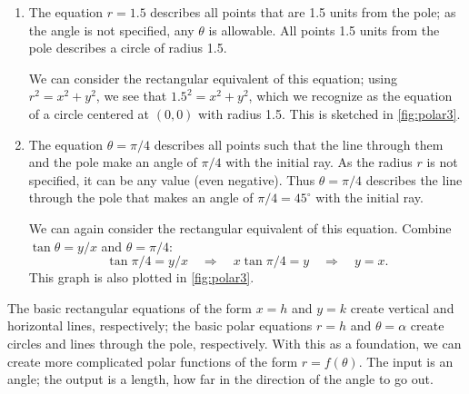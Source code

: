 {\begin{enumerate}
\item		The equation $r=1.5$ describes all points that are 1.5 units from the pole; as the angle is not specified, any $\theta$ is allowable. All points 1.5 units from the pole describes a circle of radius 1.5.

We can consider the rectangular equivalent of this equation; using $r^2=x^2+y^2$, we see that $1.5^2=x^2+y^2$, which we recognize as the equation of a circle centered at $(0,0)$ with radius 1.5. This is sketched in \autoref{fig:polar3}.


\item		The equation $\theta = \pi/4$ describes all points such that the line through them and the pole make an angle of $\pi/4$ with the initial ray. As the radius $r$ is not specified, it can be any value (even negative). Thus $\theta = \pi/4$ describes the line through the pole that makes an angle of $\pi/4 = 45^\circ$ with the initial ray.

We can again consider the rectangular equivalent of this equation. Combine $\tan \theta =y/x$ and $\theta =\pi/4$:
\[\tan \pi/4 = y/x \quad \Rightarrow \quad x\tan \pi/4 = y \quad \Rightarrow \quad y = x.\] 
This graph is also plotted in \autoref{fig:polar3}.\eoehere
\end{enumerate}}

The basic rectangular equations of the form $x=h$ and $y=k$ create vertical and horizontal lines, respectively; the basic polar equations $r= h$ and $\theta =\alpha$ create circles and lines through the pole, respectively. With this as a foundation, we can create more complicated polar functions of the form $r=f(\theta)$. The input is an angle; the output is a length, how far in the direction of the angle to go out.

